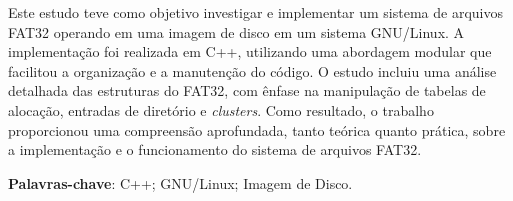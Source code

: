 \documentclass[
    12pt,				%
    oneside,   	        %
    a4paper,			%
    english,			%
    french,				%
    spanish,			%
    brazil,				%
    ]{pacotes/abntex2}
\begin{document}
\frenchspacing 



\imprimirfolhaderosto



\begin{resumo}

Este estudo teve como objetivo investigar e implementar um sistema de arquivos FAT32 operando em uma imagem de disco em um sistema GNU/Linux. A implementação foi realizada em C++, utilizando uma abordagem modular que facilitou a organização e a manutenção do código. O estudo incluiu uma análise detalhada das estruturas do FAT32, com ênfase na manipulação de tabelas de alocação, entradas de diretório e \textit{clusters}. Como resultado, o trabalho proporcionou uma compreensão aprofundada, tanto teórica quanto prática, sobre a implementação e o funcionamento do sistema de arquivos FAT32.

 \vspace{\onelineskip}
    
 \noindent
 \textbf{Palavras-chave}: C++; GNU/Linux; Imagem de Disco.
 
\end{resumo}%




\tableofcontents*
\cleardoublepage
\end{document}
